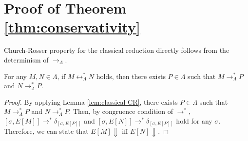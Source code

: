\section{Proof of Theorem \ref{thm:conservativity}} \label{sec:conserv-proof}
Church-Rosser property for the classical reduction directly follows from the determinism of $\longrightarrow_\Lambda$.
\begin{lem} \label{lem:classical-CR}
  For any $M, N \in \Lambda$, if $M \longleftrightarrow^*_\Lambda N$ holds, then there exists $P \in \Lambda$ such that $M \longrightarrow^*_\Lambda P$ and $N \longrightarrow^*_\Lambda P$.
\end{lem}

\ConservTheorem*
\begin{proof}[Proof]
  By applying Lemma \ref{lem:classical-CR}, there exists $P \in \Lambda$ such that $M \longrightarrow^*_\Lambda P$ and $N \longrightarrow^*_\Lambda P$.
  Then, by congruence condition of $\longrightarrow^*$, $[\sigma, E[M]] \longrightarrow^* \delta_{[\sigma, E[P]]}$ and $[\sigma, E[N]] \longrightarrow^* \delta_{[\sigma, E[P]]}$ hold for any $\sigma$.
  Therefore, we can state that $E[M]\Downarrow$ iff $E[N]\Downarrow$.
\end{proof}